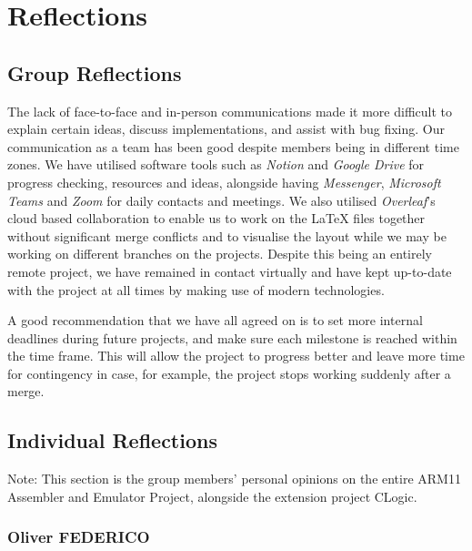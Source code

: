 \documentclass[11pt]{article}
\begin{document}
\section{Reflections}

\subsection{Group Reflections}

The lack of face-to-face and in-person communications made it more difficult to explain certain ideas, discuss implementations, and assist with bug fixing. Our communication as a team has been good despite members being in different time zones. We have utilised software tools such as \textit{Notion} and \textit{Google Drive} for progress checking, resources and ideas, alongside having \textit{Messenger}, \textit{Microsoft Teams} and \textit{Zoom} for daily contacts and meetings. We also utilised \textit{Overleaf}'s cloud based collaboration to enable us to work on the \LaTeX{} files together without significant merge conflicts and to visualise the layout while we may be working on different branches on the projects. Despite this being an entirely remote project, we have remained in contact virtually and have kept up-to-date with the project at all times by making use of modern technologies.

A good recommendation that we have all agreed on is to set more internal deadlines during future projects, and make sure each milestone is reached within the time frame. This will allow the project to progress better and leave more time for contingency in case, for example, the project stops working suddenly after a merge.

\subsection{Individual Reflections}

Note: This section is the group members' personal opinions on the entire ARM11 Assembler and Emulator Project, alongside the extension project CLogic.

\subsubsection{Oliver FEDERICO}
\end{document}
